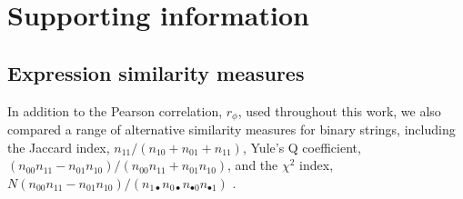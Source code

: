 \documentclass[10pt,letterpaper]{article}
\begin{document}





\newpage
\section*{Supporting information}

\subsection*{Expression similarity measures}

In addition to the Pearson correlation, $r_\phi$, used throughout this work, we also compared a range of alternative similarity measures for binary strings, including the
Jaccard index, $n_{11}/(n_{10}+n_{01}+n_{11})$,
Yule's Q coefficient, $(n_{00}n_{11} - n_{01}n_{10})/(n_{00}n_{11} + n_{01}n_{10})$,
and the $\chi^2$ index, $N (n_{00}n_{11} - n_{01}n_{10})/(n_{1\bullet}n_{0\bullet}n_{\bullet 0}n_{\bullet 1})$ \cite{Kaufman2006}.
\end{document}
